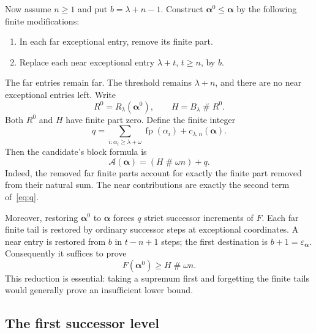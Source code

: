 \documentclass[11pt,letterpaper]{article}
\theoremstyle{definition}
\theoremstyle{remark}
\newcommand{\Aop}{\mathcal A}
\newcommand{\seq}[1]{\boldsymbol{#1}}
\newcommand{\ns}{\mathbin{\#}}
\newcommand{\fp}{\operatorname{fp}}
\newcommand{\epsa}{\varepsilon_{\seq\alpha}}
\begin{document}
Now assume $n\ge1$ and put $b=\lambda+n-1$. Construct $\seq\alpha^0\le\seq\alpha$ by the following finite modifications:

\begin{enumerate}[label=(\roman*),itemsep=2pt,topsep=3pt]
\item In each far exceptional entry, remove its finite part.
\item Replace each near exceptional entry $\lambda+t$, $t\ge n$, by $b$.
\end{enumerate}

The far entries remain far. The threshold remains $\lambda+n$, and there are no near exceptional entries left. Write
\[
 R^0=R_\lambda(\seq\alpha^0),\qquad H=B_\lambda\ns R^0.
\]
Both $R^0$ and $H$ have finite part zero. Define the finite integer
\begin{equation}\label{eq:q}
 q=\sum_{i:\alpha_i\ge\lambda+\omega}\fp(\alpha_i)
       +c_{\lambda,n}(\seq\alpha).
\end{equation}
Then the candidate's block formula is
\begin{equation}\label{eq:restore-target}
 \Aop(\seq\alpha)=(H\ns\omega n)+q.
\end{equation}
Indeed, the removed far finite parts account for exactly the finite part removed from their natural sum. The near contributions are exactly the second term of~\eqref{eq:q}.

Moreover, restoring $\seq\alpha^0$ to $\seq\alpha$ forces $q$ strict successor increments of $F$. Each far finite tail is restored by ordinary successor steps at exceptional coordinates. A near entry is restored from $b$ in $t-n+1$ steps; the first destination is $b+1=\epsa$. Consequently it suffices to prove
\begin{equation}\label{eq:core-lower}
 F(\seq\alpha^0)\ge H\ns\omega n.
\end{equation}
This reduction is essential: taking a supremum first and forgetting the finite tails would generally prove an insufficient lower bound.

\subsection{The first successor level}
\end{document}
